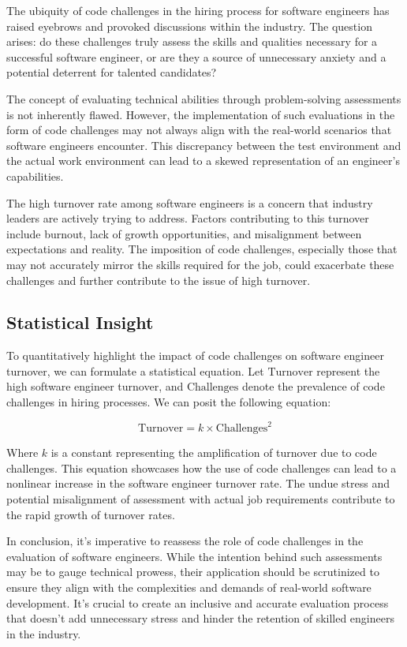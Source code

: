\documentclass[
    a4paper, %
    10pt, %
    unnumberedsections, %
    twoside, %
]{LTJournalArticle}
\begin{document}
The ubiquity of code challenges in the hiring process for software engineers has raised eyebrows and provoked discussions within the industry. The question arises: do these challenges truly assess the skills and qualities necessary for a successful software engineer, or are they a source of unnecessary anxiety and a potential deterrent for talented candidates?

The concept of evaluating technical abilities through problem-solving assessments is not inherently flawed. However, the implementation of such evaluations in the form of code challenges may not always align with the real-world scenarios that software engineers encounter. This discrepancy between the test environment and the actual work environment can lead to a skewed representation of an engineer's capabilities.

The high turnover rate among software engineers is a concern that industry leaders are actively trying to address. Factors contributing to this turnover include burnout, lack of growth opportunities, and misalignment between expectations and reality. The imposition of code challenges, especially those that may not accurately mirror the skills required for the job, could exacerbate these challenges and further contribute to the issue of high turnover.

\subsection{Statistical Insight}

To quantitatively highlight the impact of code challenges on software engineer turnover, we can formulate a statistical equation. Let $\text{Turnover}$ represent the high software engineer turnover, and $\text{Challenges}$ denote the prevalence of code challenges in hiring processes. We can posit the following equation:

\begin{equation}
    \text{Turnover} = k \times \text{Challenges}^2
\end{equation}

Where $k$ is a constant representing the amplification of turnover due to code challenges. This equation showcases how the use of code challenges can lead to a nonlinear increase in the software engineer turnover rate. The undue stress and potential misalignment of assessment with actual job requirements contribute to the rapid growth of turnover rates.



In conclusion, it's imperative to reassess the role of code challenges in the evaluation of software engineers. While the intention behind such assessments may be to gauge technical prowess, their application should be scrutinized to ensure they align with the complexities and demands of real-world software development. It's crucial to create an inclusive and accurate evaluation process that doesn't add unnecessary stress and hinder the retention of skilled engineers in the industry.
\end{document}
